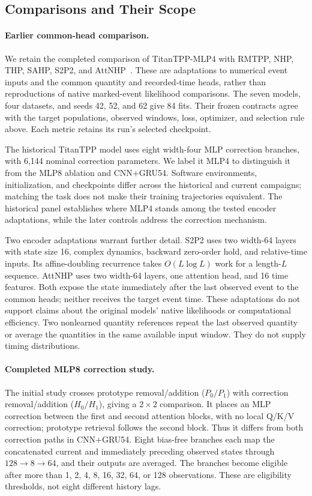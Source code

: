 \documentclass[runningheads]{llncs}
\begin{document}
\subsection{Comparisons and Their Scope}
\paragraph{Earlier common-head comparison.}
We retain the completed comparison of TitanTPP-MLP4 with RMTPP, NHP, THP, SAHP, S2P2, and AttNHP~\cite{du2016rmtpp,mei2017nhp,zuo2020thp,zhang2020sahp,chang2025s2p2,yang2022anhp}. These are adaptations to numerical event inputs and the common quantity and recorded-time heads, rather than reproductions of native marked-event likelihood comparisons. The seven models, four datasets, and seeds 42, 52, and 62 give 84 fits. Their frozen contracts agree with the target populations, observed windows, loss, optimizer, and selection rule above. Each metric retains its run's selected checkpoint.

The historical TitanTPP model uses eight width-four MLP correction branches, with 6,144 nominal correction parameters. We label it MLP4 to distinguish it from the MLP8 ablation and CNN+GRU54. Software environments, initialization, and checkpoints differ across the historical and current campaigns; matching the task does not make their training trajectories equivalent. The historical panel establishes where MLP4 stands among the tested encoder adaptations, while the later controls address the correction mechanism.

Two encoder adaptations warrant further detail. S2P2 uses two width-64 layers with state size 16, complex dynamics, backward zero-order hold, and relative-time inputs. Its affine-doubling recurrence takes $O(L\log L)$ work for a length-$L$ sequence. AttNHP uses two width-64 layers, one attention head, and 16 time features. Both expose the state immediately after the last observed event to the common heads; neither receives the target event time. These adaptations do not support claims about the original models' native likelihoods or computational efficiency. Two nonlearned quantity references repeat the last observed quantity or average the quantities in the same available input window. They do not supply timing distributions.

\paragraph{Completed MLP8 correction study.}
The initial study crosses prototype removal/addition ($P_0/P_1$) with correction removal/addition ($H_0/H_1$), giving a $2\times2$ comparison. It places an MLP correction between the first and second attention blocks, with no local Q/K/V correction; prototype retrieval follows the second block. Thus it differs from both correction paths in CNN+GRU54. Eight bias-free branches each map the concatenated current and immediately preceding observed states through $128\!\to\!8\!\to\!64$, and their outputs are averaged. The branches become eligible after more than 1, 2, 4, 8, 16, 32, 64, or 128 observations. These are eligibility thresholds, not eight different history lags.
\end{document}
